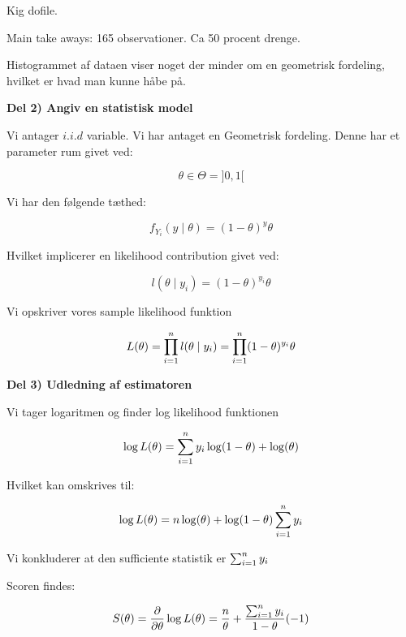 Kig dofile.

Main take aways: 165 observationer. Ca 50 procent drenge.

Histogrammet af dataen viser noget der minder om en geometrisk fordeling, hvilket er hvad man kunne håbe på.

\textbf{Del 2) Angiv en statistisk model}

Vi antager $i.i.d$ variable. Vi har antaget en Geometrisk fordeling. Denne har et parameter rum givet ved:

\begin{equation}
    \theta \in \Theta = ]0,1[
\end{equation}

Vi har den følgende tæthed:

\begin{equation}
    f_{Y_i}(y \mid \theta) = (1- \theta)^y \theta
\end{equation}

Hvilket implicerer en likelihood contribution givet ved:

\begin{equation}
    l (\theta \mid y_i) = (1 - \theta)^{y_i} \theta
\end{equation}

Vi opskriver vores sample likelihood funktion

\begin{equation}
    L(\theta) = \prod_{i=1}^{n} l (\theta \mid y_i) = \prod_{i=1}^{n} (1 - \theta)^{y_i} \theta
\end{equation}

\textbf{Del 3) Udledning af estimatoren}

Vi tager logaritmen og finder log likelihood funktionen

\begin{equation}
    \log L(\theta) = \sum_{i=1}^{n} y_i \log(1 - \theta) + \log (\theta)
\end{equation}

Hvilket kan omskrives til:

\begin{equation}
    \log L(\theta) = n \log (\theta) + \log(1- \theta) \sum_{i=1}^{n} y_i
\end{equation}

Vi konkluderer at den sufficiente statistik er $\sum_{i=1}^{n} y_i$

Scoren findes:

\begin{equation}
    S(\theta) = \frac{\partial}{\partial \theta} \log L(\theta) = \frac{n}{\theta} + \frac{\sum_{i=1}^{n} y_i}{1- \theta}(-1)
\end{equation}

